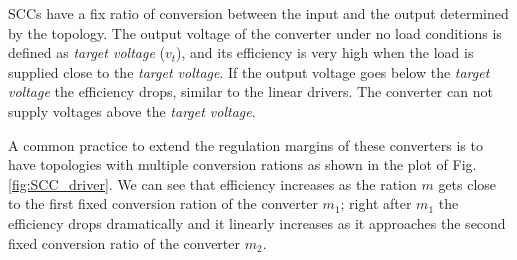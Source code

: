 SCCs have a fix ratio of conversion between the input and the output determined by the topology. The output voltage of the converter under no load conditions is defined as \emph{target voltage} ($v_t$), and its efficiency is very high when the load is supplied close to the \emph{target voltage}. If the output voltage goes below the \emph{target voltage} the efficiency drops, similar to the linear drivers.  The converter can not supply voltages above the \emph{target voltage}.

A common practice to extend the regulation margins of these converters is to have topologies with multiple conversion rations as shown in the plot of Fig. \ref{fig:SCC_driver}. We can see that efficiency increases as the ration $m$ gets close to the first fixed conversion ration of the converter $m_1$; right after $m_1$ the efficiency drops dramatically and it linearly increases as it approaches the second fixed conversion ratio of the converter $m_2$.

